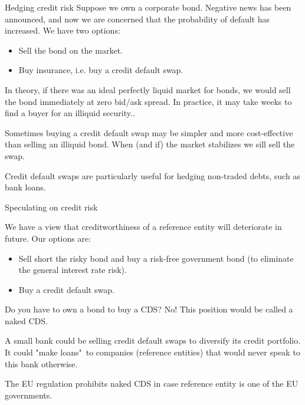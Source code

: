 \documentclass{beamer}
\begin{document}
\begin{frame}{Hedging credit risk}
\justify
Suppose we own a corporate bond. Negative news has been announced, and now we are concerned that the probability of default has increased. We have two options:
\begin{itemize}
\item Sell the bond on the market.
\item Buy insurance, i.e. buy a credit default swap.
\end{itemize}

\justify
In theory, if there was an ideal perfectly liquid market for bonds, we would sell the bond immediately at zero bid/ask spread. In practice, it may take weeks to find a buyer for an illiquid security..

\justify
Sometimes buying a credit default swap may be simpler and more cost-effective than selling an illiquid bond. When (and if) the market stabilizes we sill sell the swap.

\justify
Credit default swaps are particularly useful for hedging non-traded debts, such as bank loans.
\end{frame}



\begin{frame}{Speculating on credit risk}

\justify
We have a view that creditworthiness of a reference entity will deteriorate in future. Our options are:
\begin{itemize}
\justifying
\item Sell short the risky bond and buy a risk-free government bond (to eliminate the general interest rate risk).
\item Buy a credit default swap.
\end{itemize}

\justify
Do you have to own a bond  to buy a CDS? No! This position would be called a naked CDS.

\justify
A small bank could be selling credit default swaps to diversify its credit portfolio. It could "make loans"\ to companies (reference entities) that would never speak to this bank otherwise.

\justify
The EU regulation prohibits naked CDS in case reference entity is one of the EU governments.
\end{frame}


\renewcommand{\swapPartyNode}[4]{

	\draw (#1, #2)
		node[
			rectangle,
			draw,
			rounded corners,
			anchor = south,
			minimum height = 0.8cm,
			minimum width = 2.8cm
		]
		(#4)
		{#3};
}
\end{document}
